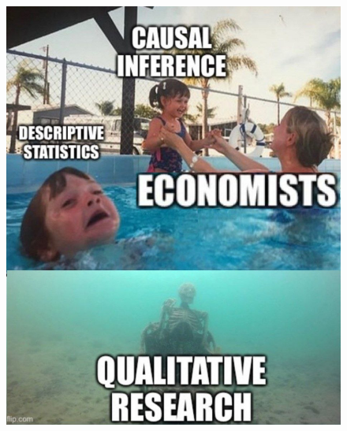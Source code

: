 \documentclass[handout]{beamer}
\begin{document}
\begin{frame}
	\begin{figure}
		\centering
		\includegraphics[width=0.55\linewidth]{./Figures/casualinference}
		\label{fig:casualinference}
	\end{figure}
	
\end{frame}




%
%
\end{document}
